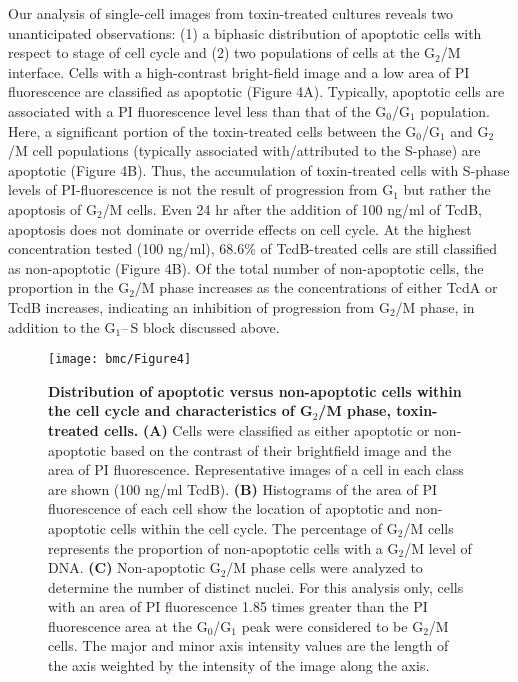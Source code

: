 Our analysis of single-cell images from toxin-treated cultures reveals two unanticipated observations: (1) a biphasic distribution of apoptotic cells with respect to stage of cell cycle and (2) two populations of cells at the G$_{\text{2}}$/M interface.  Cells with a high-contrast bright-field image and a low area of PI fluorescence are classified as apoptotic (Figure 4A). Typically, apoptotic cells are associated with a PI fluorescence level less than that of the G$_{\text{0}}$/G$_{\text{1}}$ population.  Here, a significant portion of the toxin-treated cells between the G$_{\text{0}}$/G$_{\text{1}}$ and G$_{\text{2}}$/M cell populations (typically associated with/attributed to the S-phase) are apoptotic (Figure 4B). Thus, the accumulation of toxin-treated cells with S-phase levels of PI-fluorescence is not the result of progression from G$_{\text{1}}$ but rather the apoptosis of G$_{\text{2}}$/M cells. Even 24 hr after the addition of 100 ng/ml of TcdB, apoptosis does not dominate or override effects on cell cycle. At the highest concentration tested (100 ng/ml), 68.6\% of TcdB-treated cells are still classified as non-apoptotic (Figure 4B). Of the total number of non-apoptotic cells, the proportion in the G$_{\text{2}}$/M phase increases as the concentrations of either TcdA or TcdB increases, indicating an inhibition of progression from G$_{\text{2}}$/M phase, in addition to the G$_{\text{1}}$--\,S block discussed above.


\begin{figure}[h!]
  \centering
  \texttt{[image: bmc/Figure4]}
  \caption[Distribution of apoptotic versus non-apoptotic cells within the cell cycle and characteristics of G$_{\text{2}}$/M phase, toxin-treated cells]{
  \textbf{Distribution of apoptotic versus non-apoptotic cells within the cell cycle and characteristics of G$_{\text{2}}$/M phase, toxin-treated cells.}
\textbf{(A)} Cells were classified as either apoptotic or non-apoptotic based on the contrast of their brightfield image and the area of PI fluorescence. Representative images of a cell in each class are shown (100 ng/ml TcdB). 
\textbf{(B)} Histograms of the area of PI fluorescence of each cell show the location of apoptotic and non-apoptotic cells within the cell cycle. The percentage of G$_{\text{2}}$/M cells represents the proportion of non-apoptotic cells with a G$_{\text{2}}$/M level of DNA.
\textbf{(C)} Non-apoptotic G$_{\text{2}}$/M phase cells were analyzed to determine the number of distinct nuclei. For this analysis only, cells with an area of PI fluorescence 1.85 times greater than the PI fluorescence area at the G$_{\text{0}}$/G$_{\text{1}}$ peak were considered to be G$_{\text{2}}$/M cells. The major and minor axis intensity values are the length of the axis weighted by the intensity of the image along the axis.
}
  \label{bmc:fig4}
\end{figure}


